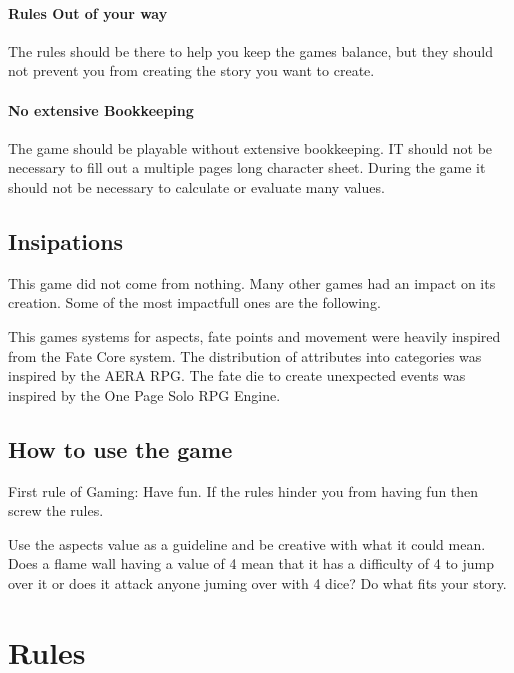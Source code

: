 \documentclass[11pt]{article}
\begin{document}
{\paragraph*{Rules Out of your way}
\label{sec:orgf2f5bf0}

The rules should be there to help you keep the games balance, but they should not prevent you from creating the story you want to create.

\paragraph*{No extensive Bookkeeping}
\label{sec:orgd5247dd}

The game should be playable without extensive bookkeeping. IT should not be necessary to fill out a multiple pages long character sheet. During the game it should not be necessary to calculate or evaluate many values.

\subsection{Insipations}
\label{sec:orgceafffe}

This game did not come from nothing. Many other games had an impact on its creation. Some of the most impactfull ones are the following.

This games systems for aspects, fate points and movement were heavily inspired from the Fate Core system.
The distribution of attributes into categories was inspired by the AERA RPG.
The fate die to create unexpected events was inspired by the One Page Solo RPG Engine.


\subsection{How to use the game}
\label{sec:org7b63f30}

First rule of Gaming: Have fun. If the rules hinder you from having fun then screw the rules.


Use the aspects value as a guideline and be creative with what it could mean. Does a flame wall having a value of 4 mean that it has a difficulty of 4 to jump over it or does it attack anyone juming over with 4 dice? Do what fits your story. 

\newpage
\section{Rules}
\label{sec:org4ec6d18}

}
\end{document}
